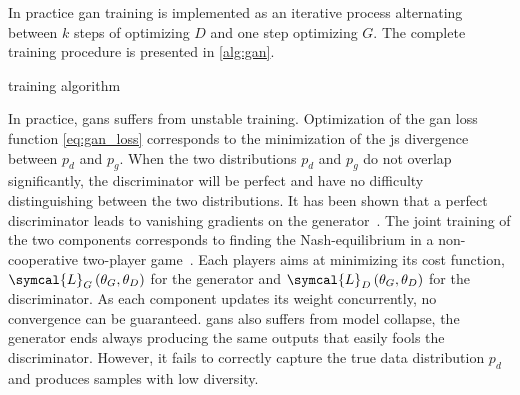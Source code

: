 \documentclass[../main.tex]{subfiles}
\begin{document}
		In practice \gls{gan} training is implemented as an iterative process alternating between \(k\) steps of optimizing \(D\) and one step optimizing \(G\).
		The complete training procedure is presented in \cref{alg:gan}.
		\begin{algorithm}[htbp]
			\DontPrintSemicolon
			\caption{ training algorithm}\label{alg:gan}
		\end{algorithm}
		In practice, \glspl{gan} suffers from unstable training.
		Optimization of the \gls{gan} loss function \cref{eq:gan_loss} corresponds to the minimization of the \gls{js} divergence between \(p_{d}\) and \(p_{g}\).
		When the two distributions \(p_d\) and \(p_g\) do not overlap significantly, the discriminator will be perfect and have no difficulty distinguishing between the two distributions.
		It has been shown that a perfect discriminator leads to vanishing gradients on the generator~\cite{Arjovsky2017TowardsPM}.
		The joint training of the two components corresponds to finding the Nash-equilibrium in a non-cooperative two-player game~\cite{Salimans2016ImprovedTF}.
		Each players aims at minimizing its cost function, \(\symcal{L}_{G}\left(\theta_{G}, \theta_{D}\right)\) for the generator and \(\symcal{L}_{D}\left(\theta_{G}, \theta_{D}\right)\) for the discriminator.
		As each component updates its weight concurrently, no convergence can be guaranteed.
		\Glspl{gan} also suffers from model collapse, the generator ends always producing the same outputs that easily fools the discriminator.
		However, it fails to correctly capture the true data distribution \(p_{d}\) and produces samples with low diversity.
\end{document}
